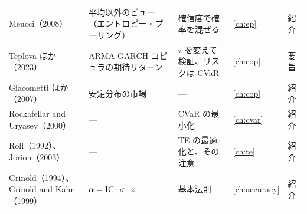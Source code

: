 \begin{longtable}{p{2.8cm}p{3.7cm}p{4.0cm}p{0.9cm}p{0.8cm}}
Meucci（2008） & 平均以外のビュー（エントロピー・プーリング） & 確信度で確率を混ぜる & \ref{ch:ep} & 紹介 \\
Teplova ほか（2023） & ARMA-GARCH-コピュラの期待リターン & $\tau$ を変えて検証、リスクは CVaR & \ref{ch:cop} & 要旨 \\
Giacometti ほか（2007） & 安定分布の市場 & --- & \ref{ch:cop} & 紹介 \\
Rockafellar and Uryasev（2000） & --- & CVaR の最小化 & \ref{ch:cvar} & 紹介 \\
Roll（1992）、Jorion（2003） & --- & TE の最適化と、その注意 & \ref{ch:te} & 紹介 \\
Grinold（1994）、Grinold and Kahn（1999） & $\alpha=\mathrm{IC}\cdot\sigma\cdot z$ & 基本法則 & \ref{ch:accuracy} & 紹介 \\
\end{longtable}

